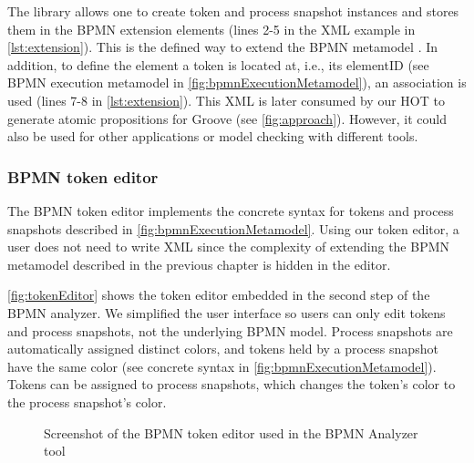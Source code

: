 \documentclass{lmcs} %
\begin{document}
The library allows one to create token and process snapshot instances and stores them in the BPMN extension elements (lines 2-5 in the XML example in \autoref{lst:extension}).
This is the defined way to extend the BPMN metamodel \cite{objectmanagementgroupBusinessProcessModel2013}.
In addition, to define the element a token is located at, i.e., its \textsf{elementID} (see BPMN execution metamodel in \autoref{fig:bpmnExecutionMetamodel}), an association is used (lines 7-8 in \autoref{lst:extension}).
This XML is later consumed by our HOT to generate atomic propositions for Groove (see \autoref{fig:approach}).
However, it could also be used for other applications or model checking with different tools.

\subsubsection{BPMN token editor}
The BPMN token editor implements the concrete syntax for tokens and process snapshots described in \autoref{fig:bpmnExecutionMetamodel}.
Using our token editor, a user does not need to write XML since the complexity of extending the BPMN metamodel described in the previous chapter is hidden in the editor.

\autoref{fig:tokenEditor} shows the token editor embedded in the second step of the BPMN analyzer.
We simplified the user interface so users can only edit tokens and process snapshots, not the underlying BPMN model.
Process snapshots are automatically assigned distinct colors, and tokens held by a process snapshot have the same color (see concrete syntax in \autoref{fig:bpmnExecutionMetamodel}).
Tokens can be assigned to process snapshots, which changes the token's color to the process snapshot's color.

\begin{figure}[ht]
    \centering
    \caption{Screenshot of the BPMN token editor used in the BPMN Analyzer tool}
    \label{fig:tokenEditor}
\end{figure}
\end{document}
